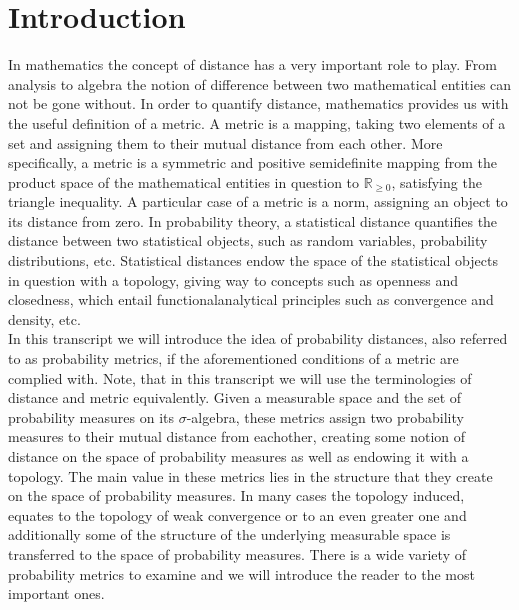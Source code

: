 \documentclass[11pt,a4paper]{article}
\begin{document}
\section{Introduction}
In mathematics the concept of distance has a very important role to play. From analysis to algebra the notion of difference between two mathematical entities can not be gone without. In order to quantify distance, mathematics provides us with the useful definition of a metric. A metric is a mapping, taking two elements of a set and assigning them to their mutual distance from each other. More specifically, a metric is a symmetric and positive semidefinite mapping from the product space of the mathematical entities in question to $\mathbb{R}_{\geq{}0}$, satisfying the triangle inequality. A particular case of a metric is a norm, assigning an object to its distance from zero. In probability theory, a statistical distance quantifies the distance between two statistical objects, such as random variables, probability distributions, etc. Statistical distances endow the space of the statistical objects in question with a topology, giving way to concepts such as openness and closedness, which entail functionalanalytical principles such as convergence and density, etc. \vspace{1em}\\
In this transcript we will introduce the idea of probability distances, also referred to as probability metrics, if the aforementioned conditions of a metric are complied with. Note, that in this transcript we will use the terminologies of distance and metric equivalently. Given a measurable space and the set of probability measures on its $\sigma$-algebra, these metrics assign two probability measures to their mutual distance from eachother, creating some notion of distance on the space of probability measures as well as endowing it with a topology. The main value in these metrics lies in the structure that they create on the space of probability measures. In many cases the topology induced, equates to the topology of weak convergence or to an even greater one and additionally some of the structure of the underlying measurable space is transferred to the space of probability measures. There is a wide variety of probability metrics to examine and we will introduce the reader to the most important ones. \vspace{1em}\\
\end{document}
